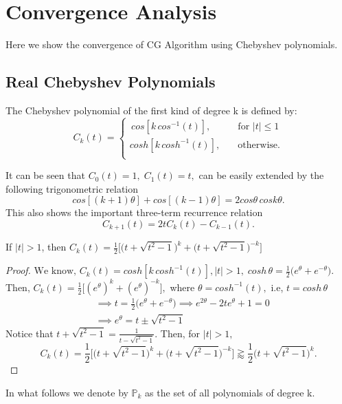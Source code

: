 \documentclass[10pt,a4paper]{article}
\begin{document}
\section{Convergence Analysis}

Here we show the convergence of CG Algorithm using Chebyshev polynomials.

\subsection{Real Chebyshev Polynomials}

\begin{mydef}
The Chebyshev polynomial of the first kind of degree k is defined by:
\[   
C_k(t) = 
     \begin{cases}	
      \, cos[k\,cos^{-1}(t)], &\quad\text{for }|t|\le 1\\
       cosh[k\,cosh^{-1}(t)], &\quad\text{otherwise.}\\
     \end{cases}
\]
\end{mydef}

It can be seen that $C_0(t)=1,\;C_1(t)=t,$ can be easily extended by the following trigonometric relation
$$cos[(k+1)\theta]+cos[(k-1)\theta]=2cos\theta\,cosk\theta.$$
This also shows the important three-term recurrence relation
$$C_{k+1}(t)=2tC_k(t)-C_{k-1}(t).$$

\begin{prop}
If $|t|>1$, then $C_k(t)=\frac{1}{2}\bigg[\Big(t+\sqrt{t^2-1}\Big)^k+\Big(t+\sqrt{t^2-1}\Big)^{-k}\bigg]$
\end{prop}

\begin{proof}
$\text{We know, }C_k(t) = cosh[k\,cosh^{-1}(t)],|t|>1,\;cosh\,\theta=\frac{1}{2}\big(e^\theta+e^{-\theta}\big).$ Then,
$C_k(t) = \frac{1}{2}\Big[(e^\theta)^k+(e^\theta)^{-k}\Big],$ where $\theta = cosh^{-1}(t),$ i.e, $t=cosh\,\theta$ 
\begin{align*}
&\implies t = \frac{1}{2}\big(e^\theta+e^{-\theta}\big) \implies e^{2\theta}-2te^\theta+1=0 \\
&\implies e^\theta = t \pm \sqrt{t^2-1}
\end{align*}
Notice that $t + \sqrt{t^2-1}=\frac{1}{t - \sqrt{t^2-1}}.$ Then, for $|t|>1,$
$$C_k(t)=\frac{1}{2}\bigg[\Big(t+\sqrt{t^2-1}\Big)^k+\Big(t+\sqrt{t^2-1}\Big)^{-k}\bigg]\gtrapprox\frac{1}{2}\Big(t+\sqrt{t^2-1}\Big)^k.$$
\end{proof}

In what follows  we denote by $\mathbb{P}_k$ as the set of all polynomials of degree k.
\end{document}
